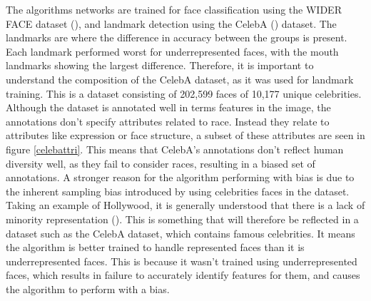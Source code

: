 \documentclass{l4proj}
\begin{document}
The algorithms networks are trained for face classification using the WIDER FACE dataset (\cite{widerface}), and landmark detection using the CelebA (\cite{celeba}) dataset. The landmarks are where the difference in accuracy between the groups is present. Each landmark performed worst for underrepresented faces, with the mouth landmarks showing the largest difference. Therefore, it is important to understand the composition of the CelebA dataset, as it was used for landmark training. This is a dataset consisting of 202,599 faces of 10,177 unique celebrities. Although the dataset is annotated well in terms features in the image, the annotations don't specify attributes related to race. Instead they relate to attributes like expression or face structure, a subset of these attributes are seen in figure \ref{celebattri}. This means that CelebA's annotations don't reflect human diversity well, as they fail to consider races, resulting in a biased set of annotations. A stronger reason for the algorithm performing with bias is due to the inherent sampling bias introduced by using celebrities faces in the dataset. Taking an example of Hollywood, it is generally understood that there is a lack of minority representation (\cite{hollywoo}). This is something that will therefore be reflected in a dataset such as the CelebA dataset, which contains famous celebrities. It means the algorithm is better trained to handle represented faces than it is underrepresented faces. This is because it wasn't trained using underrepresented faces, which results in failure to accurately identify features for them, and causes the algorithm to perform with a bias.
\end{document}
